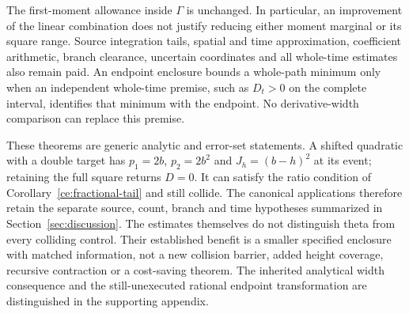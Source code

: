 The first-moment allowance inside $\Gamma$ is unchanged. In particular,
an improvement of the linear combination does not justify reducing
either moment marginal or its square range. Source integration tails,
spatial and time approximation, coefficient arithmetic, branch clearance,
uncertain coordinates and all whole-time estimates also remain paid.
An endpoint enclosure bounds a whole-path minimum only when an
independent whole-time premise, such as $D_t>0$ on the complete interval,
identifies that minimum with the endpoint. No derivative-width comparison
can replace this premise.

These theorems are generic analytic and error-set statements. A shifted
quadratic with a double target has $p_1=2b$, $p_2=2b^2$ and
$J_h=(b-h)^2$ at its event; retaining the full square returns $D=0$.
It can satisfy the ratio condition of Corollary~\ref{ce:fractional-tail}
and still collide. The canonical applications therefore retain the
separate source, count, branch and time hypotheses summarized in
Section~\ref{sec:discussion}. The estimates themselves do not distinguish
theta from every colliding control. Their established benefit is a
smaller specified enclosure with matched information, not a new
collision barrier, added height coverage, recursive contraction or a
cost-saving theorem. The inherited analytical width consequence and the
still-unexecuted rational endpoint transformation are distinguished in
the supporting appendix.

